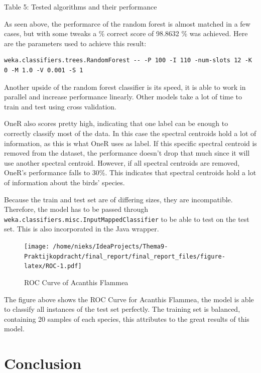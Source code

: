 \documentclass[
]{article}
\begin{document}
\begin{center}
Table 5: Tested algorithms and their performance \label{tab:tab5}
\end{center}

As seen above, the performarce of the random forest is almost matched in
a few cases, but with some tweaks a \% correct score of 98.8632 \% was
achieved. Here are the parameters used to achieve this result:

\begin{verbatim}
weka.classifiers.trees.RandomForest -- -P 100 -I 110 -num-slots 12 -K 0 -M 1.0 -V 0.001 -S 1
\end{verbatim}

Another upside of the random forest classifier is its speed, it is able
to work in parallel and increase performance linearly. Other models take
a lot of time to train and test using cross validation.

OneR also scores pretty high, indicating that one label can be enough to
correctly classify most of the data. In this case the spectral centroids
hold a lot of information, as this is what OneR uses as label. If this
specific spectral centroid is removed from the dataset, the performance
doesn't drop that much since it will use another spectral centroid.
However, if all spectral centroids are removed, OneR's performance falls
to 30\%. This indicates that spectral centroids hold a lot of
information about the birds' species.

Because the train and test set are of differing sizes, they are
incompatible. Therefore, the model has to be passed through
\texttt{weka.classifiers.misc.InputMappedClassifier} to be able to test
on the test set. This is also incorporated in the Java wrapper.

\newpage

\begin{figure}
\centering
\texttt{[image: /home/nieks/IdeaProjects/Thema9-Praktijkopdracht/final\_report/final\_report\_files/figure-latex/ROC-1.pdf]}
\caption{\label{fig:fig6}ROC Curve of Acanthis Flammea}
\end{figure}

The figure above shows the ROC Curve for Acanthis Flammea, the model is
able to classify all instances of the test set perfectly. The training
set is balanced, containing 20 samples of each species, this attributes
to the great results of this model.

\newpage

\hypertarget{conclusion}{%
\section{Conclusion}\label{conclusion}}
\end{document}
